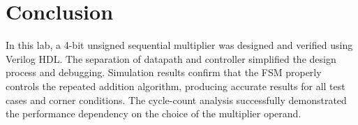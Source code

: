 \documentclass[12pt,a4paper]{article}
\begin{document}
\section*{Conclusion}
In this lab, a 4-bit unsigned sequential multiplier was designed and verified using Verilog HDL. The separation of datapath and controller simplified the design process and debugging. Simulation results confirm that the FSM properly controls the repeated addition algorithm, producing accurate results for all test cases and corner conditions. The cycle-count analysis successfully demonstrated the performance dependency on the choice of the multiplier operand.
\end{document}
